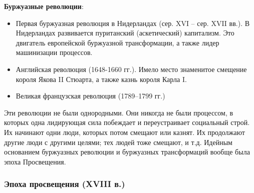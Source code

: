 \textbf{Буржуазные революции}:

\begin{itemize}
    \item Первая буржуазная революция в Нидерландах (сер. XVI – сер. XVII вв.).  В Нидерландах развивается пуританский (аскетический) капитализм. Это двигатель европейской буржуазной трансформации, а также лидер машинизации процессов.
    \item Английская революция (1648-1660 гг.). Имело место знаменитое смещение короля Якова II Стюарта, а также казнь короля Карла I.
    \item Великая французская революция (1789–1799 гг.)
\end{itemize}

Эти революции не были однородными. Они никогда не были процессом, в которых одна лидирующая сила побеждает и переустраивает социальный строй. Их начинают одни люди, которых потом смещают или казнят. Их продолжают другие люди с другими целями; тех людей тоже смещают, и т.д.
Идейным основанием буржуазных революции и буржуазных трансформаций вообще была эпоха Просвещения. 



\subsubsection{Эпоха просвещения (XVIII в.)} 








